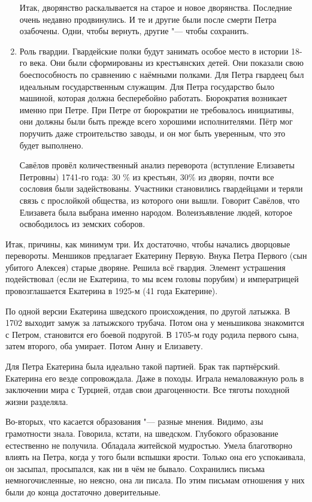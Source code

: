 \begin{enumerate}
Итак, дворянство раскалывается на старое и новое дворянства. Последние очень недавно продвинулись. И те и другие были после смерти Петра озабочены. Одни, чтобы вернуть, другие "--- чтобы сохранить.
\item Роль гвардии. Гвардейские полки будут занимать особое место в истории 18-го века. Они были сформированы из крестъянских детей. Они показали свою боеспособность по сравнению с наёмными полками. Для Петра гвардеец был идеальным государственным служащим. Для Петра государство было машиной, которая должна бесперебойно работать. Бюрократия возникает именно при Петре. При Петре от бюрократии не требовалось инициативы, они должны были быть прежде всего хорошими исполнителями. Пётр мог поручить даже строительство заводы, и он мог быть уверенным, что это будет выполнено.

Савёлов провёл количественный анализ переворота (вступление Елизаветы Петровны) 1741-го года: 30 \% из крестьян, 30\% из дворян, \ldotst{ } почти все сословия были задействованы. Участники становились гвардейцами и теряли связь с прослойкой общества, из которого они вышли. Говорит Савёлов, что Елизавета была выбрана именно народом. Волеизъявление людей, которое освободилось из земских соборов.
\end{enumerate}

Итак, причины, как минимум три. Их достаточно, чтобы начались дворцовые перевороты. Меншиков предлагает Екатерину Первую. Внука Петра Первого (сын убитого Алексея) старые дворяне. Решила всё гвардия. Элемент устрашения подействовал (если не Екатерина, то мы всем головы порубим) и императрицей провозглашается Екатерина в 1925-м (41 года Екатерине).

По одной версии Екатерина шведского происхождения, по другой латыжка. В 1702 выходит замуж за латыжского трубача. Потом она у меньшикова знакомится с Петром, становится его боевой подругой. В 1705-м году родила первого сына, затем второго, оба умирает. Потом Анну и Елизавету.

Для Петра Екатерина была идеально такой партией. Брак так партнёрский. Екатерина его везде сопровождала. Даже в походы. Играла немаловажную роль в заключении мира с Турцией, отдав свои драгоценности. Все тяготы походной жизни разделяла.

Во-вторых, что касается образования "--- разные мнения. Видимо, азы грамотности знала. Говорила, кстати, на шведском. Глубокого образование естественно не получила. Обладала житейской мудростью. Умела благотворно влиять на Петра, когда у того были вспышки ярости. Только она его успокаивала, он засыпал, просыпался, как ни в чём не бывало. Сохранились письма немногочисленные, но неясно, она ли писала. По этим письмам отношения у них были до конца достаточно доверительные.

